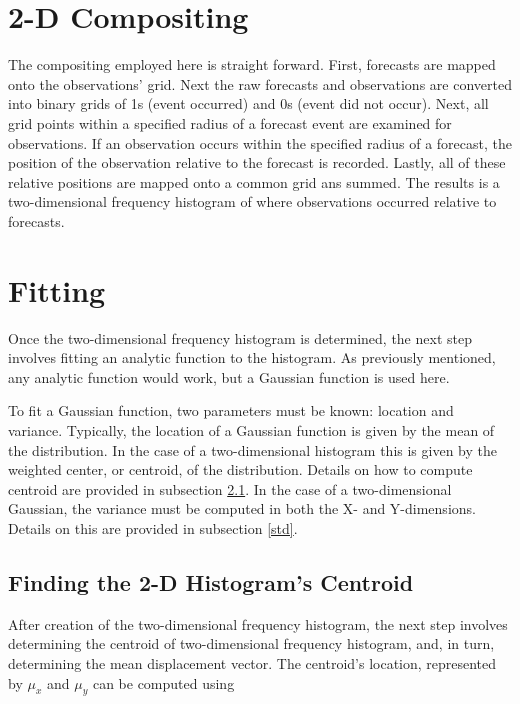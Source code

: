\section{2-D Compositing}
\label{compositing}

The compositing employed here is straight forward.
First, forecasts are mapped onto the observations' grid.
Next the raw forecasts and observations are converted into binary grids of 1s (event occurred) and 0s (event did not occur).
Next, all grid points within a specified radius of a forecast event are examined for observations.
If an observation occurs within the specified radius of a forecast, the position of the observation relative to the forecast is recorded.
Lastly, all of these relative positions are mapped onto a common grid ans summed.
The results is a two-dimensional frequency histogram of where observations occurred relative to forecasts.




\section{Fitting}
\label{fitting}

Once the two-dimensional frequency histogram is determined, the next step involves fitting an analytic function to the histogram.
As previously mentioned, any analytic function would work, but a Gaussian function is used here.

To fit a Gaussian function, two parameters must be known: location and variance.
Typically, the location of a Gaussian function is given by the mean of the distribution.
In the case of a two-dimensional histogram this is given by the weighted center, or centroid, of the distribution.
Details on how to compute centroid are provided in subsection \ref{centroid}.
In the case of a two-dimensional Gaussian, the variance must be computed in both the X- and Y-dimensions.
Details on this are provided in subsection \ref{std}.




\subsection{Finding the 2-D Histogram's Centroid}
\label{centroid}

After creation of the two-dimensional frequency histogram, the next step involves determining the centroid of two-dimensional frequency histogram, and, in turn, determining the mean displacement vector.
The centroid's location, represented by $\mu_x$ and $\mu_y$ can be computed using

